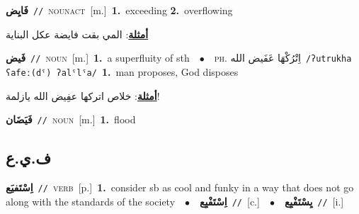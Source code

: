 \documentclass[10pt,a4paper,twoside]{article} %
\begin{document}
\begin{multicols}{2}
{\setlength\topsep{0pt}\textbf{\foreignlanguage{arabic}{فَايِض}}\ {\color{gray}\texttt{//}\color{black}}\ \textsc{noun\textunderscore act}\ [m.]\ \textbf{1.}~exceeding  \textbf{2.}~overflowing\  \begin{flushright}\color{gray}\foreignlanguage{arabic}{\textbf{\underline{\foreignlanguage{arabic}{أمثلة}}}: المي بقت فايضة عكل البناية}\end{flushright}\color{black}} \vspace{2mm}

{\setlength\topsep{0pt}\textbf{\foreignlanguage{arabic}{فَيض}}\ {\color{gray}\texttt{//}\color{black}}\ \textsc{noun}\ [m.]\ \textbf{1.}~a superfluity of sth\ \ $\bullet$\ \ \textsc{ph.} \color{gray} \foreignlanguage{arabic}{اِتْرُكْهَا عَفَيض الله}\color{black}\ {\color{gray}\texttt{/{\sffamily ʔutrukha ʕafeː(dˤ) ʔalˤlˤa}/}\color{black}}\ \textbf{1.}~man proposes, God disposes\  \begin{flushright}\color{gray}\foreignlanguage{arabic}{\textbf{\underline{\foreignlanguage{arabic}{أمثلة}}}: خلاص اتركها عفِيض الله يازلمة!}\end{flushright}\color{black}} \vspace{2mm}

{\setlength\topsep{0pt}\textbf{\foreignlanguage{arabic}{فَيَضَان}}\ {\color{gray}\texttt{//}\color{black}}\ \textsc{noun}\ [m.]\ \textbf{1.}~flood\ } \vspace{2mm}

\vspace{-3mm}
\subsection*{\color{blue}\foreignlanguage{arabic}{ف.ي.ع}\color{blue}{}} 

{\setlength\topsep{0pt}\textbf{\foreignlanguage{arabic}{اِسْتَفيَع}}\ {\color{gray}\texttt{//}\color{black}}\ \textsc{verb}\ [p.]\ \textbf{1.}~consider sb as cool and funky in a way that does not go along with the standards of the society\ \ $\bullet$\ \ \setlength\topsep{0pt}\textbf{\foreignlanguage{arabic}{اِسْتَفْيِع}}\ {\color{gray}\texttt{//}\color{black}}\ [c.]\ \ $\bullet$\ \ \setlength\topsep{0pt}\textbf{\foreignlanguage{arabic}{يِسْتَفْيِع}}\ {\color{gray}\texttt{//}\color{black}}\ [i.]\ } \vspace{2mm}


\end{multicols}
\end{document}
